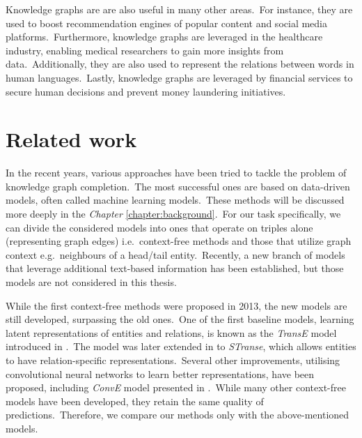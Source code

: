 \documentclass[longabstract, english, mgr]{iithesis}
\theoremstyle{default_theorem_style}\newtheorem{theorem}{Theorem}
\theoremstyle{default_theorem_style}\newtheorem{definition}{Definition}
\begin{document}
\noindent Knowledge graphs are are also useful in many other areas.\ For instance, they are used to boost
recommendation engines of popular content and social media platforms.\ Furthermore, knowledge graphs are leveraged
in the healthcare industry, enabling medical researchers to gain more insights from data.\ Additionally, they are
also used to represent the relations between words in human languages.\ Lastly, knowledge graphs are leveraged by
financial services to secure human decisions and prevent money laundering initiatives.


\section{Related work}

In the recent years, various approaches have been tried to tackle the problem of knowledge graph completion.\ The most
successful ones are based on data-driven models, often called machine learning models.\ These methods will be
discussed more deeply in the \textit{Chapter} \ref{chapter:background}.\ For our task specifically, we can divide the
considered models into ones that operate on triples alone (representing graph edges) i.e.\ context-free methods and
those that utilize graph context e.g.\ neighbours of a head/tail entity.\ Recently, a new branch of models that
leverage additional text-based information has been established, but those models are not considered in this
thesis.\newline

\noindent While the first context-free methods were proposed in 2013, the new models are still developed, surpassing
the old ones.\ One of the first baseline models, learning latent representations of entities and relations, is known
as the \textit{TransE} model introduced in \cite{transe_model}.\ The model was later extended in \cite{stranse_model}
to \textit{STranse}, which allows entities to have relation-specific representations.\ Several other
improvements, utilising convolutional neural networks to learn better representations, have been proposed,
including \textit{ConvE} model presented in \cite{conve_model}.\ While many other context-free models have been
developed, they retain the same quality of predictions.\ Therefore, we compare our methods only with the
above-mentioned models.\newline
\end{document}
